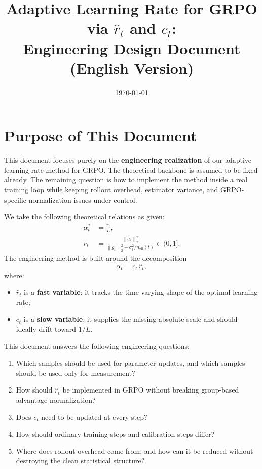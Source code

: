 \documentclass[11pt,a4paper]{article}
\title{\textbf{Adaptive Learning Rate for GRPO via $\hat r_t$ and $c_t$: \\ Engineering Design Document (English Version)}}
\author{}
\date{\today}
\newcommand{\norm}[1]{\left\lVert #1 \right\rVert_2}
\newcommand{\rt}{r_t}
\newcommand{\rhat}{\hat r_t}
\newcommand{\alphaopt}{\alpha_t^{\ast}}
\begin{document}
\maketitle
\tableofcontents
\newpage

\section{Purpose of This Document}
This document focuses purely on the \textbf{engineering realization} of our adaptive learning-rate method for GRPO. The theoretical backbone is assumed to be fixed already. The remaining question is how to implement the method inside a real training loop while keeping rollout overhead, estimator variance, and GRPO-specific normalization issues under control.

We take the following theoretical relations as given:
\begin{align}
\alphaopt &= \frac{\rt}{L}, \\
\rt &= \frac{\norm{g_t}^2}{\norm{g_t}^2 + \sigma_t^2 / n_{\mathrm{eff}}(t)} \in (0,1].
\end{align}
The engineering method is built around the decomposition
\begin{equation}
\alpha_t = c_t\,\rhat,
\end{equation}
where:
\begin{itemize}[leftmargin=2em]
    \item $\rhat$ is a \textbf{fast variable}: it tracks the time-varying shape of the optimal learning rate;
    \item $c_t$ is a \textbf{slow variable}: it supplies the missing absolute scale and should ideally drift toward $1/L$.
\end{itemize}

This document answers the following engineering questions:
\begin{enumerate}[label=\arabic*., leftmargin=2em]
    \item Which samples should be used for parameter updates, and which samples should be used only for measurement?
    \item How should $\rhat$ be implemented in GRPO without breaking group-based advantage normalization?
    \item Does $c_t$ need to be updated at every step?
    \item How should ordinary training steps and calibration steps differ?
    \item Where does rollout overhead come from, and how can it be reduced without destroying the clean statistical structure?
\end{enumerate}
\end{document}

